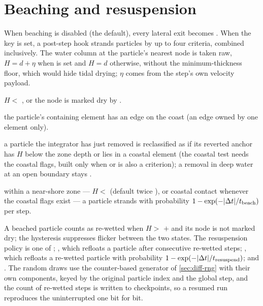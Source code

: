 \section{Beaching and resuspension}\label{sec:life-beach}

When beaching is disabled (the default), every lateral exit becomes . When the key
 is set, a post-step hook strands particles by up to four criteria, combined
inclusively. The water column at the particle's nearest node is taken raw, $H=d+\eta$ when
 is set and $H=d$ otherwise, without the minimum-thickness floor, which would hide tidal
drying; $\eta$ comes from the step's own velocity payload.
\begin{description}[font=\normalfont\conf,style=nextline,leftmargin=1.5em]
  \item[depth] $H<$ , or the node is marked dry by .
  \item[coastal\_element] the particle's containing element has an edge on the coast (an edge owned by one
    element only).
  \item[on\_failure] a particle the integrator has just removed is reclassified as  if its
    reverted anchor has $H$ below the zone depth or lies in a coastal element (the coastal test needs the
    coastal flags, built only when  or  is also a criterion); a removal in deep water at an
    open boundary stays .
  \item[stochastic] within a near-shore zone --- $H<$  (default twice ), or
    coastal contact whenever the coastal flags exist --- a particle strands with probability
    $1-\exp(-\lvert\Delta t\rvert/t_{\text{beach}})$ per step.
\end{description}
A beached particle counts as re-wetted when $H>$  $+$  and its node is
not marked dry; the hysteresis suppresses flicker between the two states. The resuspension policy is one of
; , which refloats a particle after  consecutive re-wetted steps;
, which refloats a re-wetted particle with probability $1-\exp(-\lvert\Delta t\rvert/t_{\text{resuspend}})$;
and . The random draws use the counter-based generator of \cref{sec:diff-rng} with
their own components, keyed by the original particle index and the global step, and the count of re-wetted
steps is written to checkpoints, so a resumed run reproduces the uninterrupted one bit for bit.

